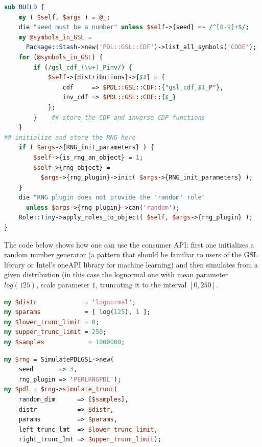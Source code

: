 \documentclass[10pt]{article}
\begin{document}
\begin{lstlisting}[language=Perl,basicstyle=\footnotesize,frame=none,caption={BUILD method for the consumer module for truncated random number generation.},label={lst:ConsumerPDLBUILD},captionpos=b]
sub BUILD {
    my ( $self, $args ) = @_;
    die "seed must be a number" unless $self->{seed} =~ /^[0-9]+$/;
    my @symbols_in_GSL =
      Package::Stash->new('PDL::GSL::CDF')->list_all_symbols('CODE');
    for (@symbols_in_GSL) {
        if (/gsl_cdf_(\w+)_Pinv/) {
            $self->{distributions}->{$1} = {
                cdf     => $PDL::GSL::CDF::{"gsl_cdf_$1_P"},
                inv_cdf => $PDL::GSL::CDF::{$_}
            };
        }    ## store the CDF and inverse CDF functions
    }
## initialize and store the RNG here
    if ( $args->{RNG_init_parameters} ) {
        $self->{is_rng_an_object} = 1;
        $self->{rng_object} =
          $args->{rng_plugin}->init( $args->{RNG_init_parameters} );
    }
    die "RNG plugin does not provide the 'random' role"
      unless $args->{rng_plugin}->can('random');
    Role::Tiny->apply_roles_to_object( $self, $args->{rng_plugin} );
}
\end{lstlisting}

The code below shows how one can use the consumer API: first one initializes a random number generator (a pattern that should be familiar to users of the GSL library or Intel's oneAPI library for machine learning) and then simulates from a given distribution (in this case the lognormal one with mean parameter $log(125)$, scale parameter $1$, truncating it to the interval $[0,250]$.
\medskip 

\begin{minipage}{0.44\textwidth}
\begin{lstlisting}[language=Perl,basicstyle=\footnotesize,frame=single,captionpos=b]
my $distr             = 'lognormal';
my $params            = [ log(125), 1 ];
my $lower_trunc_limit = 0;
my $upper_trunc_limit = 250;
my $samples            = 1000000;
\end{lstlisting}
\end{minipage}\hfill
\begin{minipage}{0.50\textwidth}
\begin{lstlisting}[language=Perl,basicstyle=\footnotesize,frame=single,captionpos=b]
my $rng = SimulatePDLGSL->new(
    seed       => 3, 
    rng_plugin => 'PERLRNGPDL');
my $pdl = $rng->simulate_trunc(
    random_dim      => [$samples],
    distr           => $distr,
    params          => $params,
    left_trunc_lmt  => $lower_trunc_limit,
    right_trunc_lmt => $upper_trunc_limit);
\end{lstlisting}
\end{minipage}
\medskip
\end{document}
